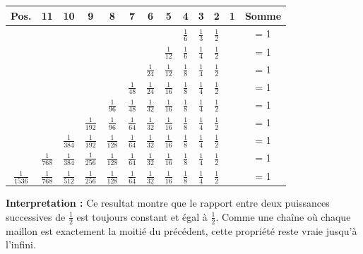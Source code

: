 \documentclass[a4paper,11pt]{article}
\newenvironment{resume}{%
    \begin{tcolorbox}[colback=purple!5,colframe=holpurple,title={\textbf{Résumé visuel}}]
}{%
    \end{tcolorbox}
}
\begin{document}
\begin{center}
\scriptsize
\begin{tabular}{|c|c|c|c|c|c|c|c|c|c|c|c|c|}
\hline
\textbf{Pos.} & 11 & 10 & 9 & 8 & 7 & 6 & 5 & 4 & 3 & 2 & 1 & \textbf{Somme} \\
\hline
& & & & & & & & $\frac{1}{6}$ & $\frac{1}{3}$ & $\frac{1}{2}$ & & = 1 \\
\hline
& & & & & & & $\frac{1}{12}$ & $\frac{1}{6}$ & $\frac{1}{4}$ & $\frac{1}{2}$ & & = 1 \\
\hline
& & & & & & $\frac{1}{24}$ & $\frac{1}{12}$ & $\frac{1}{8}$ & $\frac{1}{4}$ & $\frac{1}{2}$ & & = 1 \\
\hline
& & & & & $\frac{1}{48}$ & $\frac{1}{24}$ & $\frac{1}{16}$ & $\frac{1}{8}$ & $\frac{1}{4}$ & $\frac{1}{2}$ & & = 1 \\
\hline
& & & & $\frac{1}{96}$ & $\frac{1}{48}$ & $\frac{1}{32}$ & $\frac{1}{16}$ & $\frac{1}{8}$ & $\frac{1}{4}$ & $\frac{1}{2}$ & & = 1 \\
\hline
& & & $\frac{1}{192}$ & $\frac{1}{96}$ & $\frac{1}{64}$ & $\frac{1}{32}$ & $\frac{1}{16}$ & $\frac{1}{8}$ & $\frac{1}{4}$ & $\frac{1}{2}$ & & = 1 \\
\hline
& & $\frac{1}{384}$ & $\frac{1}{192}$ & $\frac{1}{128}$ & $\frac{1}{64}$ & $\frac{1}{32}$ & $\frac{1}{16}$ & $\frac{1}{8}$ & $\frac{1}{4}$ & $\frac{1}{2}$ & & = 1 \\
\hline
& $\frac{1}{768}$ & $\frac{1}{384}$ & $\frac{1}{256}$ & $\frac{1}{128}$ & $\frac{1}{64}$ & $\frac{1}{32}$ & $\frac{1}{16}$ & $\frac{1}{8}$ & $\frac{1}{4}$ & $\frac{1}{2}$ & & = 1 \\
\hline
$\frac{1}{1536}$ & $\frac{1}{768}$ & $\frac{1}{512}$ & $\frac{1}{256}$ & $\frac{1}{128}$ & $\frac{1}{64}$ & $\frac{1}{32}$ & $\frac{1}{16}$ & $\frac{1}{8}$ & $\frac{1}{4}$ & $\frac{1}{2}$ & & = 1 \\
\hline
\end{tabular}
\end{center}

\begin{resume}
\textbf{Interpretation :} Ce resultat montre que le rapport entre deux puissances successives de $\frac{1}{2}$ est toujours constant et égal à $\frac{1}{2}$. Comme une chaîne où chaque maillon est exactement la moitié du précédent, cette propriété reste vraie jusqu'à l'infini.
\end{resume}

\end{document}
